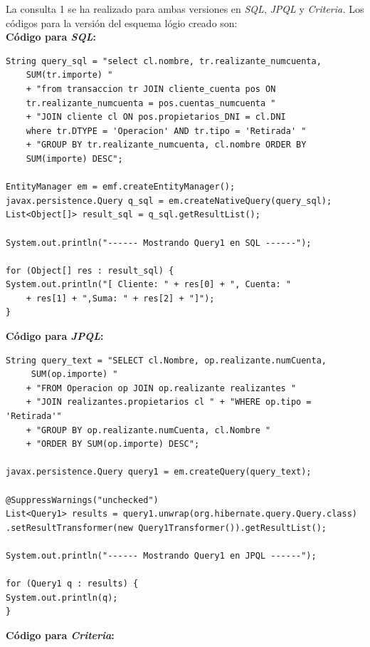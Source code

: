 \documentclass[11pt,a4paper]{article}
\begin{document}
La consulta 1 se ha realizado para ambas versiones en \textit{SQL}, \textit{JPQL} y \textit{Criteria.}
Los códigos para la versión del esquema lógio creado son:\\
\bigbreak
\textbf{Código para \textit{SQL}:}
\begin{lstlisting}
String query_sql = "select cl.nombre, tr.realizante_numcuenta,
    SUM(tr.importe) "
	+ "from transaccion tr JOIN cliente_cuenta pos ON 
	tr.realizante_numcuenta = pos.cuentas_numcuenta "
	+ "JOIN cliente cl ON pos.propietarios_DNI = cl.DNI 
	where tr.DTYPE = 'Operacion' AND tr.tipo = 'Retirada' "
	+ "GROUP BY tr.realizante_numcuenta, cl.nombre ORDER BY 
	SUM(importe) DESC";

EntityManager em = emf.createEntityManager();
javax.persistence.Query q_sql = em.createNativeQuery(query_sql);
List<Object[]> result_sql = q_sql.getResultList();

System.out.println("------ Mostrando Query1 en SQL ------");

for (Object[] res : result_sql) {
System.out.println("[ Cliente: " + res[0] + ", Cuenta: " 
	+ res[1] + ",Suma: " + res[2] + "]");
}
\end{lstlisting}
\newpage
\textbf{Código para \textit{JPQL}:}
\begin{lstlisting}
String query_text = "SELECT cl.Nombre, op.realizante.numCuenta,
	 SUM(op.importe) "
	+ "FROM Operacion op JOIN op.realizante realizantes "
	+ "JOIN realizantes.propietarios cl " + "WHERE op.tipo = 'Retirada'"
	+ "GROUP BY op.realizante.numCuenta, cl.Nombre " 
	+ "ORDER BY SUM(op.importe) DESC";

javax.persistence.Query query1 = em.createQuery(query_text);

@SuppressWarnings("unchecked")
List<Query1> results = query1.unwrap(org.hibernate.query.Query.class)
.setResultTransformer(new Query1Transformer()).getResultList();

System.out.println("------ Mostrando Query1 en JPQL ------");

for (Query1 q : results) {
System.out.println(q);
}

\end{lstlisting}
\bigbreak
\textbf{Código para \textit{Criteria}:}
\end{document}
